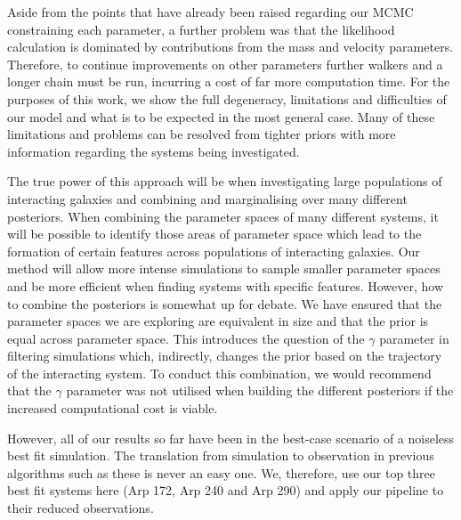 Aside from the points that have already been raised regarding our MCMC constraining each parameter, a further problem was that the likelihood calculation is dominated by contributions from the mass and velocity parameters. Therefore, to continue improvements on other parameters further walkers and a longer chain must be run, incurring a cost of far more computation time. For the purposes of this work, we show the full degeneracy, limitations and difficulties of our model and what is to be expected in the most general case. Many of these limitations and problems can be resolved from tighter priors with more information regarding the systems being investigated.

The true power of this approach will be when investigating large populations of interacting galaxies and combining and marginalising over many different posteriors. When combining the parameter spaces of many different systems, it will be possible to identify those areas of parameter space which lead to the formation of certain features across populations of interacting galaxies. Our method will allow more intense simulations to sample smaller parameter spaces and be more efficient when finding systems with specific features. However, how to combine the posteriors is somewhat up for debate. We have ensured that the parameter spaces we are exploring are equivalent in size and that the prior is equal across parameter space. This introduces the question of the $\gamma$ parameter in filtering simulations which, indirectly, changes the prior based on the trajectory of the interacting system. To conduct this combination, we would recommend that the $\gamma$ parameter was not utilised when building the different posteriors if the increased computational cost is viable.

However, all of our results so far have been in the best-case scenario of a noiseless best fit simulation. The translation from simulation to observation in previous algorithms such as these is never an easy one. We, therefore, use our top three best fit systems here (Arp 172, Arp 240 and Arp 290) and apply our pipeline to their reduced observations.

